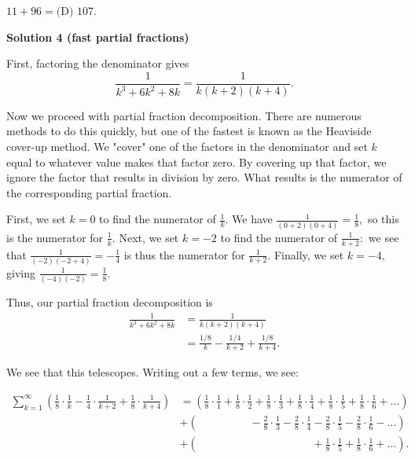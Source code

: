 \begin{enumerate}
 $11+96 = \boxed{\text{(D) }107}.$




\textbf{Solution 4 (fast partial fractions)}

First, factoring the denominator gives 
 \[\frac{1}{k^3 + 6k^2 + 8k} = \frac{1}{k(k+2)(k+4)}.\] 

 Now we proceed with partial fraction decomposition. There are numerous methods to do this quickly, but one of the fastest is known as the Heaviside cover-up method. We "cover" one of the factors in the denominator and set $k$ equal to whatever value makes that factor zero. By covering up that factor, we ignore the factor that results in division by zero. What results is the numerator of the corresponding partial fraction. 

 First, we set $k=0$ to find the numerator of $\frac1k.$ We have $\frac{1}{(0+2)(0+4)}=\frac18,$ so this is the numerator for $\frac1k.$ Next, we set $k=-2$ to find the numerator of $\frac{1}{k+2}:$ we see that $\frac{1}{(-2)(-2+4)}=-\frac14$ is thus the numerator for $\frac{1}{k+2}.$ Finally, we set $k=-4,$ giving $\frac{1}{(-4)(-2)}=\frac18.$

 Thus, our partial fraction decomposition is \begin{align*}\frac{1}{k^3 + 6k^2 + 8k} &= \frac{1}{k(k+2)(k+4)} \\&= \frac{1/8}{k} - \frac{1/4}{k+2} + \frac{1/8}{k+4}. \end{align*}


 We see that this telescopes. Writing out a few terms, we see:

 \begin{align*}\sum_{k=1}^\infty \left( \frac{1}{8}\cdot\frac{1}{k} - \frac{1}{4}\cdot\frac{1}{k+2} + \frac{1}{8}\cdot\frac{1}{k+4} \right) &= \left(\frac{1}{8}\cdot\frac{1}{1} + \frac{1}{8}\cdot\frac{1}{2} + \frac{1}{8}\cdot\frac{1}{3} + \frac{1}{8}\cdot\frac{1}{4} + \frac{1}{8}\cdot\frac{1}{5} + \frac{1}{8}\cdot\frac{1}{6} + \dots\right) \\&+ \left(\phantom{\frac{1}{8}\cdot\frac{1}{1} + \frac{1}{8}\cdot\frac{1}{2}\;}- \frac{2}{8}\cdot\frac{1}{3} - \frac{2}{8}\cdot\frac{1}{4} - \frac{2}{8}\cdot\frac{1}{5} - \frac{2}{8}\cdot\frac{1}{6} - \dots\right) \\&+ \left(\phantom{\frac{1}{8}\cdot\frac{1}{1} + \frac{1}{8}\cdot\frac{1}{2} + \frac{1}{8}\cdot\frac{1}{3} + \frac{1}{8}\cdot\frac{1}{4}\;}+ \frac{1}{8}\cdot\frac{1}{5} + \frac{1}{8}\cdot\frac{1}{6} + \dots\right).\end{align*}



\end{enumerate}
